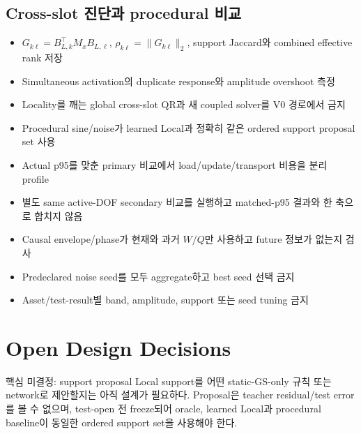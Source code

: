 \documentclass[10pt,a4paper]{article}
\begin{document}
\subsection{Cross-slot 진단과 procedural 비교}

\begin{itemize}
  \item[$\square$] \(G_{k\ell}=B_{L,k}^\top M_xB_{L,\ell}\),
  \(\rho_{k\ell}=\lVert G_{k\ell}\rVert_2\), support Jaccard와 combined effective rank 저장
  \item[$\square$] Simultaneous activation의 duplicate response와 amplitude overshoot 측정
  \item[$\square$] Locality를 깨는 global cross-slot QR과 새 coupled solver를 V0 경로에서 금지
  \item[$\square$] Procedural sine/noise가 learned Local과 정확히 같은 ordered support proposal set 사용
  \item[$\square$] Actual p95를 맞춘 primary 비교에서 load/update/transport 비용을 분리 profile
  \item[$\square$] 별도 same active-DOF secondary 비교를 실행하고 matched-p95 결과와 한 축으로 합치지 않음
  \item[$\square$] Causal envelope/phase가 현재와 과거 \(W/Q\)만 사용하고 future 정보가 없는지 검사
  \item[$\square$] Predeclared noise seed를 모두 aggregate하고 best seed 선택 금지
  \item[$\square$] Asset/test-result별 band, amplitude, support 또는 seed tuning 금지
\end{itemize}

\section{Open Design Decisions}
\label{sec:r5-chapter-5}

\begin{decisionbox}{핵심 미결정: support proposal}
Local support를 어떤 static-GS-only 규칙 또는 network로 제안할지는 아직 설계가 필요하다.
Proposal은 teacher residual/test error를 볼 수 없으며, test-open 전 freeze되어 oracle, learned Local과
procedural baseline이 동일한 ordered support set을 사용해야 한다.
\end{decisionbox}
\end{document}
